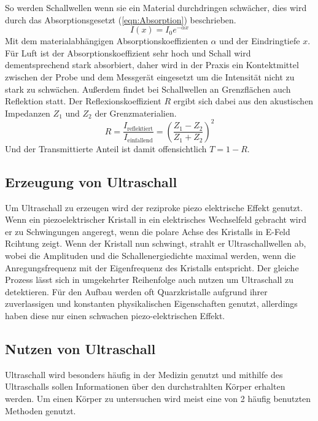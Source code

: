 So werden Schallwellen wenn sie ein Material durchdringen schwächer, dies wird durch das Absorptionsgesetzt (\ref{eqn:Absorption}) beschrieben.
\begin{equation}
    I(x) = I_0 e^{-\alpha x} \label{eqn:Absorption}
\end{equation}
Mit dem materialabhängigen Absorptionskoeffizienten $\alpha$ und der Eindringtiefe $x$.
Für Luft ist der Absorptionskoeffizient sehr hoch und Schall wird dementsprechend stark absorbiert, daher wird in der Praxis ein Kontektmittel zwischen der Probe und dem Messgerät eingesetzt um die Intensität nicht zu stark zu schwächen.
Außerdem findet bei Schallwellen an Grenzflächen auch Reflektion statt.
Der Reflexionskoeffizient $R$ ergibt sich dabei aus den akustischen Impedanzen $Z_1$ und $Z_2$ der Grenzmaterialien.
\begin{equation}
    R = \frac{I_{\text{reflektiert}}}{I_{\text{einfallend}}} = \left( \frac{Z_1-Z_2}{Z_1+Z_2}  \right)^2 \nonumber
\end{equation}
Und der Transmittierte Anteil ist damit offensichtlich $T = 1-R$.

\subsection{Erzeugung von Ultraschall}
Um Ultraschall zu erzeugen wird der reziproke piezo elektrische Effekt genutzt.
Wenn ein piezoelektrischer Kristall in ein elektrisches Wechselfeld gebracht wird er zu Schwingungen angeregt, wenn die polare Achse des Kristalls in E-Feld Rcihtung zeigt.
Wenn der Kristall nun schwingt, strahlt er Ultraschallwellen ab, wobei die Amplituden und die Schallenergiedichte maximal werden, wenn die Anregungsfrequenz mit der Eigenfrequenz des Kristalls entspricht.
Der gleiche Prozess lässt sich in umgekehrter Reihenfolge auch nutzen um Ultraschall zu detektieren.
Für den Aufbau werden oft Quarzkristalle aufgrund ihrer zuverlassigen und konstanten physikalischen Eigenschaften genutzt, allerdings haben diese nur einen schwachen piezo-elektrischen Effekt.
\subsection{Nutzen von Ultraschall}
Ultraschall wird besonders häufig in der Medizin genutzt und mithilfe des Ultraschalls sollen Informationen über den durchstrahlten Körper erhalten werden.
Um einen Körper zu untersuchen wird meist eine von 2 häufig benutzten Methoden genutzt.
